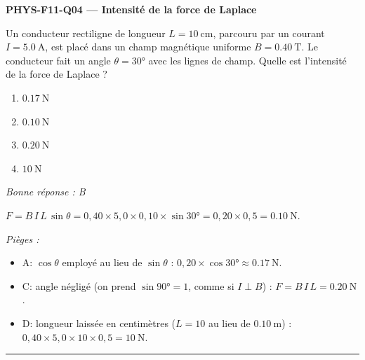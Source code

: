 \documentclass[11pt,a4paper]{article}
\newcommand{\vv}[1]{\vec{#1}}\newcommand{\ds}{\displaystyle}
\begin{document}
\noindent\textbf{PHYS-F11-Q04 --- Intensité de la force de Laplace}\par
Un conducteur rectiligne de longueur $L=\qty{10}{\centi\metre}$, parcouru par un courant $I=\qty{5.0}{\ampere}$, est placé dans un champ magnétique uniforme $B=\qty{0.40}{\tesla}$. Le conducteur fait un angle $\theta=\ang{30}$ avec les lignes de champ. Quelle est l'intensité de la force de Laplace ?
\begin{center}
\end{center}
\begin{enumerate}[label=\Alph*)]
\item $\qty{0.17}{\newton}$
\item $\qty{0.10}{\newton}$
\item $\qty{0.20}{\newton}$
\item $\qty{10}{\newton}$
\end{enumerate}
\textit{Bonne réponse : B}\par
$F=B\,I\,L\,\sin\theta=0{,}40\times5{,}0\times0{,}10\times\sin\ang{30}=0{,}20\times0{,}5=\qty{0.10}{\newton}$.\par
\textit{Pièges :}
\begin{itemize}
\item A: $\cos\theta$ employé au lieu de $\sin\theta$ : $0{,}20\times\cos\ang{30}\approx\qty{0.17}{\newton}$.
\item C: angle négligé (on prend $\sin\ang{90}=1$, comme si $I\perp B$) : $F=B\,I\,L=\qty{0.20}{\newton}$.
\item D: longueur laissée en centimètres ($L=10$ au lieu de $\qty{0.10}{\metre}$) : $0{,}40\times5{,}0\times10\times0{,}5=\qty{10}{\newton}$.
\end{itemize}
\vspace{8pt}\hrule\vspace{8pt}
\end{document}
